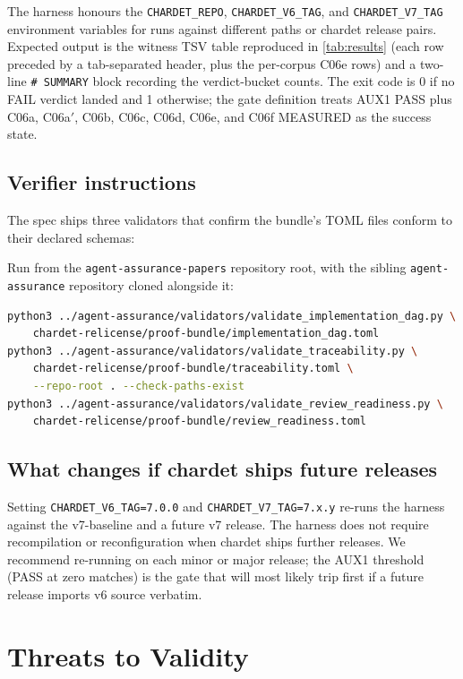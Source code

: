 \documentclass[11pt,letterpaper]{article}
\begin{document}
The harness honours the \texttt{CHARDET\_REPO}, \texttt{CHARDET\_V6\_TAG},
and \texttt{CHARDET\_V7\_TAG} environment variables for runs against
different paths or chardet release pairs. Expected output is the
witness TSV table reproduced in \cref{tab:results} (each row
preceded by a tab-separated header, plus the per-corpus C06e rows)
and a two-line \texttt{\#
SUMMARY} block recording the verdict-bucket counts. The exit code
is 0 if no FAIL verdict landed and 1 otherwise; the gate definition
treats AUX1 PASS plus C06a, C06a$'$, C06b, C06c, C06d, C06e, and
C06f MEASURED as the success state.

\subsection{Verifier instructions}
\label{sec:verifier}
The spec ships three validators that confirm the bundle's TOML
files conform to their declared schemas:

Run from the \texttt{agent-assurance-papers} repository root, with the
sibling \texttt{agent-assurance} repository cloned alongside it:

\begin{lstlisting}[language=bash,caption={Running the spec validators.}]
python3 ../agent-assurance/validators/validate_implementation_dag.py \
    chardet-relicense/proof-bundle/implementation_dag.toml
python3 ../agent-assurance/validators/validate_traceability.py \
    chardet-relicense/proof-bundle/traceability.toml \
    --repo-root . --check-paths-exist
python3 ../agent-assurance/validators/validate_review_readiness.py \
    chardet-relicense/proof-bundle/review_readiness.toml
\end{lstlisting}

\subsection{What changes if chardet ships future releases}
\label{sec:future-tags}
Setting \texttt{CHARDET\_V6\_TAG=7.0.0} and
\texttt{CHARDET\_V7\_TAG=7.x.y} re-runs the harness against the
v7-baseline and a future v7 release. The harness does not require
recompilation or reconfiguration when chardet ships further releases.
We recommend re-running on each minor or major release; the AUX1
threshold (PASS at zero matches) is the gate that will most likely
trip first if a future release imports v6 source verbatim.

\section{Threats to Validity}
\label{sec:threats}
\end{document}
